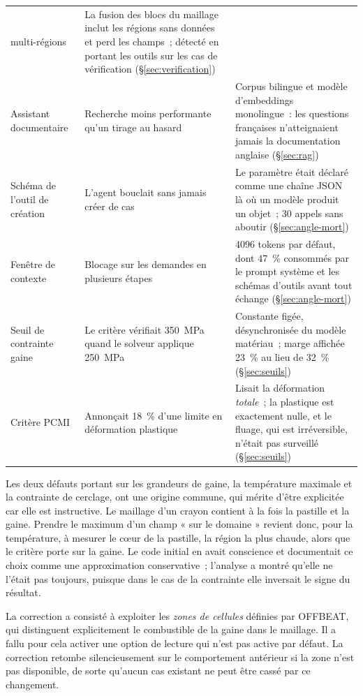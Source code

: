 \documentclass[12pt,a4paper,french]{report}
\begin{document}
\begin{table}[htbp]
\begin{tabularx}{\textwidth}{@{}>{\raggedright\arraybackslash}p{3.3cm}XX@{}}
  multi-régions & La fusion des blocs du maillage inclut les régions sans
  données et perd les champs~; détecté en portant les outils sur les cas de
  vérification (§\ref{sec:verification})\\
\addlinespace
Assistant documentaire & Recherche moins performante qu'un tirage au hasard &
  Corpus bilingue et modèle d'embeddings monolingue~: les questions françaises
  n'atteignaient jamais la documentation anglaise (§\ref{sec:rag})\\
\addlinespace
Schéma de l'outil de création & L'agent bouclait sans jamais créer de cas &
  Le paramètre était déclaré comme une chaîne JSON là où un modèle produit un
  objet~; 30 appels sans aboutir (§\ref{sec:angle-mort})\\
\addlinespace
Fenêtre de contexte & Blocage sur les demandes en plusieurs étapes &
  \num{4096} tokens par défaut, dont \SI{47}{\percent} consommés par le prompt
  système et les schémas d'outils avant tout échange (§\ref{sec:angle-mort})\\
\addlinespace
Seuil de contrainte gaine & Le critère vérifiait \SI{350}{\mega\pascal} quand le
  solveur applique \SI{250}{\mega\pascal} & Constante figée, désynchronisée du
  modèle matériau~; marge affichée \SI{23}{\percent} au lieu de
  \SI{32}{\percent} (§\ref{sec:seuils})\\
\addlinespace
Critère PCMI & Annonçait \SI{18}{\percent} d'une limite en déformation
  plastique & Lisait la déformation \emph{totale}~; la plastique est exactement
  nulle, et le fluage, qui est irréversible, n'était pas surveillé
  (§\ref{sec:seuils})\\
\bottomrule
\end{tabularx}
\end{table}

Les deux défauts portant sur les grandeurs de gaine, la température maximale
et la contrainte de cerclage, ont une origine commune, qui mérite d'être
explicitée car elle est instructive. Le maillage d'un crayon contient à la fois
la pastille et la gaine. Prendre le maximum d'un champ « sur le domaine »
revient donc, pour la température, à mesurer le c\oe ur de la pastille, la
région la plus chaude, alors que le critère porte sur la gaine. Le code
initial en avait conscience et documentait ce choix comme une approximation
conservative~; l'analyse a montré qu'elle ne l'était pas toujours, puisque dans
le cas de la contrainte elle inversait le signe du résultat.

La correction a consisté à exploiter les \textit{zones de cellules} définies par
OFFBEAT, qui distinguent explicitement le combustible de la gaine dans le
maillage. Il a fallu pour cela activer une option de lecture qui n'est pas
active par défaut. La correction retombe silencieusement sur le comportement
antérieur si la zone n'est pas disponible, de sorte qu'aucun cas existant ne
peut être cassé par ce changement.
\end{document}
